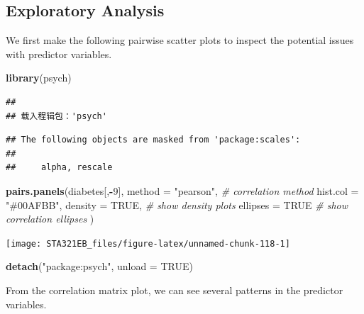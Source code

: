 \documentclass[
]{book}
\newenvironment{Shaded}{\begin{snugshade}}{\end{snugshade}}
\newcommand{\AttributeTok}[1]{\textcolor[rgb]{0.13,0.29,0.53}{#1}}
\newcommand{\CommentTok}[1]{\textcolor[rgb]{0.56,0.35,0.01}{\textit{#1}}}
\newcommand{\ConstantTok}[1]{\textcolor[rgb]{0.56,0.35,0.01}{#1}}
\newcommand{\DecValTok}[1]{\textcolor[rgb]{0.00,0.00,0.81}{#1}}
\newcommand{\FunctionTok}[1]{\textcolor[rgb]{0.13,0.29,0.53}{\textbf{#1}}}
\newcommand{\NormalTok}[1]{#1}
\newcommand{\SpecialCharTok}[1]{\textcolor[rgb]{0.81,0.36,0.00}{\textbf{#1}}}
\newcommand{\StringTok}[1]{\textcolor[rgb]{0.31,0.60,0.02}{#1}}
\begin{document}
\hypertarget{exploratory-analysis}{%
\subsection{Exploratory Analysis}\label{exploratory-analysis}}

We first make the following pairwise scatter plots to inspect the potential issues with predictor variables.

\begin{Shaded}
\begin{Highlighting}[]
\FunctionTok{library}\NormalTok{(psych)}
\end{Highlighting}
\end{Shaded}

\begin{verbatim}
## 
## 载入程辑包：'psych'
\end{verbatim}

\begin{verbatim}
## The following objects are masked from 'package:scales':
## 
##     alpha, rescale
\end{verbatim}

\begin{Shaded}
\begin{Highlighting}[]
\FunctionTok{pairs.panels}\NormalTok{(diabetes[,}\SpecialCharTok{{-}}\DecValTok{9}\NormalTok{], }
             \AttributeTok{method =} \StringTok{"pearson"}\NormalTok{, }\CommentTok{\# correlation method}
             \AttributeTok{hist.col =} \StringTok{"\#00AFBB"}\NormalTok{,}
             \AttributeTok{density =} \ConstantTok{TRUE}\NormalTok{,  }\CommentTok{\# show density plots}
             \AttributeTok{ellipses =} \ConstantTok{TRUE} \CommentTok{\# show correlation ellipses}
\NormalTok{             )}
\end{Highlighting}
\end{Shaded}

\begin{center}\texttt{[image: STA321EB\_files/figure-latex/unnamed-chunk-118-1]} \end{center}

\begin{Shaded}
\begin{Highlighting}[]
\FunctionTok{detach}\NormalTok{(}\StringTok{"package:psych"}\NormalTok{, }\AttributeTok{unload =} \ConstantTok{TRUE}\NormalTok{)}
\end{Highlighting}
\end{Shaded}

From the correlation matrix plot, we can see several patterns in the predictor variables.
\end{document}
